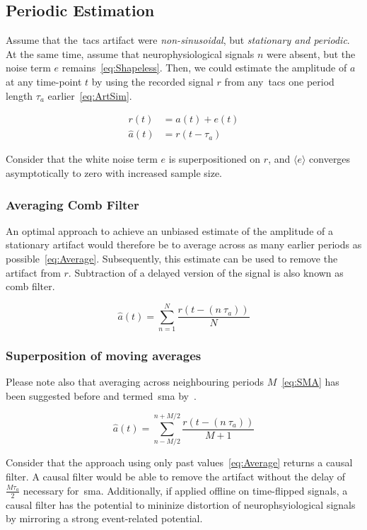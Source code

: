 \documentclass[a4paper]{article}
\begin{document}
\subsection{Periodic Estimation}
Assume that the~\gls{tacs} artifact were \emph{non-sinusoidal}, but \emph{stationary and periodic}. At the same time, assume that neurophysiological signals $n$ were absent, but the noise term $e$ remains~\eqref{eq:Shapeless}. Then, we could estimate the amplitude of $a$ at any time-point $t$ by using the recorded signal $r$ from any~\gls{tacs} one period length $\tau_a$ earlier~\eqref{eq:ArtSim}.

\begin{align}
    r(t) & = a(t) + e(t)\label{eq:Shapeless}\\
    \hat{a}(t) & = r(t-\tau_a)\label{eq:ArtSim}
\end{align}

Consider that the white noise term $e$ is superpositioned on $r$, and  $\langle e\rangle$ converges asymptotically to zero with increased sample size.

\subsubsection{Averaging Comb Filter}
An optimal approach to achieve an unbiased estimate of the amplitude of a stationary artifact would therefore be to average across as many earlier periods as possible~\eqref{eq:Average}. Subsequently, this estimate can be used to  remove the artifact from $r$. Subtraction of a delayed version of the signal is also known as comb filter.

\begin{equation}
    \hat{a}(t) = \sum_{n=1}^{N} \frac{r(t - (n~\tau_a))}{N}\label{eq:Average}
\end{equation}

\subsubsection{Superposition of moving averages}
Please note also that averaging across neighbouring periods $M$~\eqref{eq:SMA} has been suggested before and termed~\gls{sma} by~\cite{Kohli_2015}.

\begin{equation}
    \hat{a}(t) = \sum_{n-M/2}^{n+M/2} \frac{r(t - (n~\tau_a))}{M+1}\label{eq:SMA}
\end{equation}

Consider that the approach using only past values~\eqref{eq:Average} returns a causal filter. A causal filter would be able to remove the artifact without the delay of $\frac{M \tau_a}{2}$ necessary for~\gls{sma}. Additionally, if applied offline on time-flipped signals, a causal filter has the potential to mininize distortion of neurophsyiological signals by mirroring a strong event-related potential.
\end{document}
